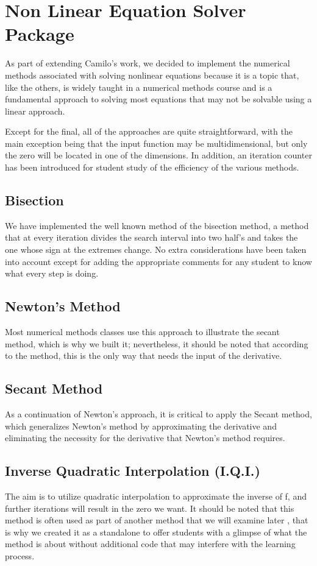 \section{Non Linear Equation Solver Package}
As part of extending Camilo's work, we decided to implement the numerical methods associated with solving nonlinear equations because it is a topic that, like the others, is widely taught in a numerical methods course and is a fundamental approach to solving most equations that may not be solvable using a linear approach.

Except for the final, all of the approaches are quite straightforward, with the main exception being that the input function may be multidimensional, but only the zero will be located in one of the dimensions. In addition, an iteration counter has been introduced for student study of the efficiency of the various methods.

\subsection{Bisection}
We have implemented the well known method of the bisection method, a method that at every iteration divides the search interval into two half's and takes the one whose sign at the extremes change. No extra considerations have been taken into account except for adding the appropriate comments for any student to know what every step is doing.

\subsection{Newton's Method}
Most numerical methods classes use this approach to illustrate the secant method, which is why we built it; nevertheless, it should be noted that according to the method, this is the only way that needs the input of the derivative.

\subsection{Secant Method}
As a continuation of Newton's approach, it is critical to apply the Secant method, which generalizes Newton's method by approximating the derivative and eliminating the necessity for the derivative that Newton's method requires. 

\subsection{Inverse Quadratic Interpolation (I.Q.I.)}
The aim is to utilize quadratic interpolation to approximate the inverse of f, and further iterations will result in the zero we want. It should be noted that this method is often used as part of another method that we will examine later \cite{10.5555/2553197}, that is why we created it as a standalone to offer students with a glimpse of what the method is about without additional code that may interfere with the learning process.

